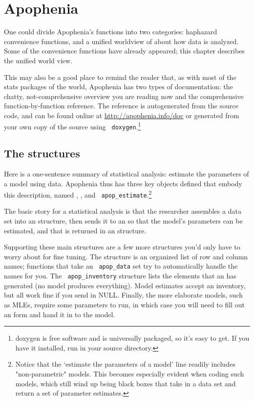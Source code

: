 \chapter{Apophenia} \label{apop}

One could divide Apophenia's functions into two categories: haphazard
convenience functions, and a unified worldview of about how data is
analyzed. Some of the convenience functions have already appeared; this
chapter describes the unified world view. 

This may also be a good place to remind the reader that, as with most of
the stats packages of the world, Apophenia has two types of
documentation: the chatty, not-comprehensive overview you are reading now and the
comprehensive function-by-function reference. The reference is autogenerated from the
source code, and can be found online at \url{http://apophenia.info/doc}
or generated from your own copy of the source using {\tt
doxygen}.\footnote{doxygen is free software and is universally packaged,
so it's easy to get. If you have it installed, run  in
your source directory.}

\section{The structures}
Here is a one-sentence summary of statistical analysis: estimate the
parameters of a model
using data. Apophenia thus has three key objects defined that embody
this description, named , , and {\tt
apop\_estimate}.\footnote{Notice that the `estimate the parameters of a
model' line readily includes "non-parametric" models. This becomes
especially evident when coding such models, which still wind up being
black boxes that take in a data set and return a set of parameter
estimates.}

The basic story for a statistical analysis is that the researcher
assembles a data set into an  structure, then sends it to
an  so that the model's parameters can be estimated,
and that is returned in an  structure.

Supporting these main structures are a few more structures you'd only
have to worry about for fine tuning.  The  structure is
an organized list of row and column names; functions that take an {\tt
apop\_data} set try to automatically handle the names for you.  The {\tt
apop\_inventory} structure lists the elements that an 
has generated (no model produces everything). Model estimates accept
an inventory, but all work fine if you send in NULL. Finally, the more
elaborate models, such as MLEs, require some parameters to run, in
which case you will need to fill out an 
form and hand it in to the model.


